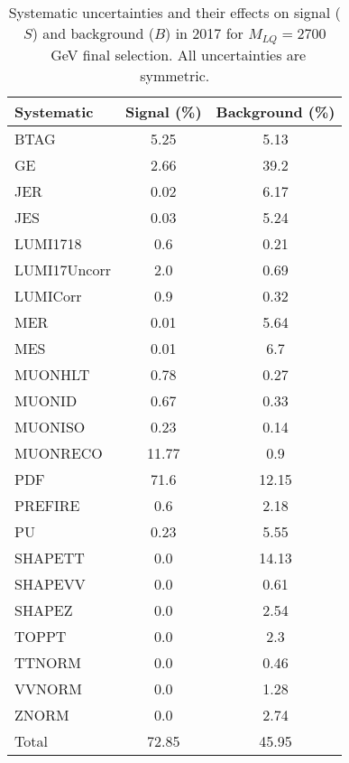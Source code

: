 \begin{table}[htbp]
\begin{center}
\caption{Systematic uncertainties and their effects on signal ($S$) and background ($B$) in 2017 for $M_{LQ}=2700$~GeV final selection. All uncertainties are symmetric.}
\begin{tabular}{lcc}
\hline\hline
Systematic & Signal (\%) & Background (\%) \\ \hline 
BTAG & 5.25 & 5.13\\ 
GE & 2.66 & 39.2\\ 
JER & 0.02 & 6.17\\ 
JES & 0.03 & 5.24\\ 
LUMI1718 & 0.6 & 0.21\\ 
LUMI17Uncorr & 2.0 & 0.69\\ 
LUMICorr & 0.9 & 0.32\\ 
MER & 0.01 & 5.64\\ 
MES & 0.01 & 6.7\\ 
MUONHLT & 0.78 & 0.27\\ 
MUONID & 0.67 & 0.33\\ 
MUONISO & 0.23 & 0.14\\ 
MUONRECO & 11.77 & 0.9\\ 
PDF & 71.6 & 12.15\\ 
PREFIRE & 0.6 & 2.18\\ 
PU & 0.23 & 5.55\\ 
SHAPETT & 0.0 & 14.13\\ 
SHAPEVV & 0.0 & 0.61\\ 
SHAPEZ & 0.0 & 2.54\\ 
TOPPT & 0.0 & 2.3\\ 
TTNORM & 0.0 & 0.46\\ 
VVNORM & 0.0 & 1.28\\ 
ZNORM & 0.0 & 2.74\\ 
Total & 72.85 & 45.95\\ \hline \hline
\end{tabular}
\label{tab:SysUncertainties_uujj_2700}
\end{center}
\end{table}

